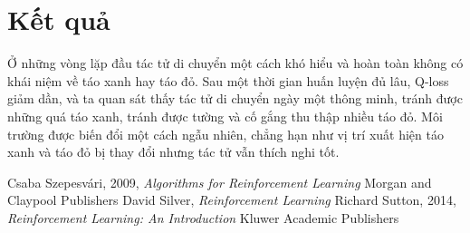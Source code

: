 \documentclass[14pt,a4paper,oneside]{report}		%
\begin{document}
\chapter{Kết quả}
	Ở những vòng lặp đầu tác tử di chuyển một cách khó hiểu và hoàn toàn không có khái niệm về táo xanh hay táo đỏ. Sau một thời gian huấn luyện đủ lâu, Q-loss giảm dần, và ta quan sát thấy tác tử di chuyển ngày một thông minh, tránh được những quá táo xanh, tránh được tường và cố gắng thu thập nhiều táo đỏ. Môi trường được biến đổi một cách ngẫu nhiên, chẳng hạn như vị trí xuất hiện táo xanh và táo đỏ bị thay đổi nhưng tác tử vẫn thích nghi tốt.
\begin{thebibliography}{12}
Csaba Szepesvári, 2009, {\it Algorithms for Reinforcement Learning} Morgan and Claypool Publishers
David Silver, {\it Reinforcement Learning}
Richard Sutton, 2014, {\it  Reinforcement Learning: An Introduction} Kluwer Academic Publishers
\end{thebibliography}
\end{document}
